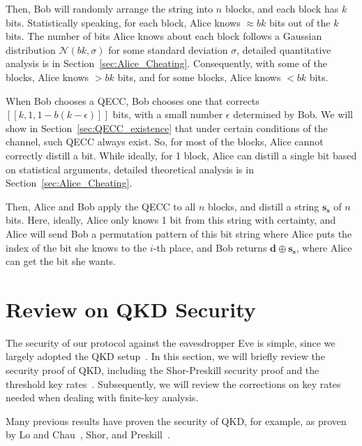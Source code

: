 \documentclass[%
 reprint,
superscriptaddress,
 amsmath,amssymb,
 aps,
]{revtex4-2}
\begin{document}
Then, Bob will randomly arrange the string into $n$ blocks, and each block has $k$ bits. Statistically speaking, for each block, Alice knows $\approx bk$ bits out of the $k$ bits. The number of bits Alice knows about each block follows a Gaussian distribution $\mathcal{N}(bk, \sigma)$ for some standard deviation $\sigma$, detailed quantitative analysis is in Section~\ref{sec:Alice_Cheating}. Consequently, with some of the blocks, Alice knows $> bk$ bits, and for some blocks, Alice knows $< bk$ bits.

When Bob chooses a QECC, Bob chooses one that corrects $[[k, 1, 1-b(k-\epsilon)]]$ bits, with a small number $\epsilon$ determined by Bob. We will show in Section~\ref{sec:QECC_existence} that under certain conditions of the channel, such QECC always exist. So, for most of the blocks, Alice cannot correctly distill a bit. While ideally, for 1 block, Alice can distill a single bit based on statistical arguments, detailed theoretical analysis is in Section~\ref{sec:Alice_Cheating}.

Then, Alice and Bob apply the QECC to all $n$ blocks, and distill a string $\mathbf{s_s}$ of $n$ bits. Here, ideally, Alice only knows 1 bit from this string with certainty, and Alice will send Bob a permutation pattern of this bit string where Alice puts the index of the bit she knows to the $i$-th place, and Bob returns $\mathbf{d}\oplus \mathbf{s_s}$, where Alice can get the bit she wants.


\section{Review on QKD Security}
\label{sec:Review_qkd_security}
The security of our protocol against the eavesdropper Eve is simple, since we largely adopted the QKD setup~\cite{BB84, BB84_30years, BBM92}. In this section, we will briefly review the security proof of QKD, including the Shor-Preskill security proof and the threshold key rates~\cite{Shor_Preskill_Proof1}. Subsequently, we will review the corrections on key rates needed when dealing with finite-key analysis. 

Many previous results have proven the security of QKD, for example, as proven by Lo and Chau~\cite{Lo_Chau_proof}, Shor, and Preskill~\cite{Shor_Preskill_Proof1}.
\end{document}
